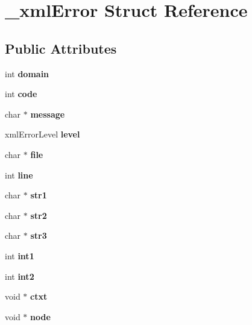 \hypertarget{struct__xml_error}{}\section{\+\_\+xml\+Error Struct Reference}
\label{struct__xml_error}
\subsection*{Public Attributes}
\begin{DoxyCompactItemize}
\item 
\mbox{\label{struct__xml_error_aab2c2106653999b10a5927fbef170134}} 
int {\bfseries domain}
\item 
\mbox{\label{struct__xml_error_a26d37a9627e5767d10642f7575b456cb}} 
int {\bfseries code}
\item 
\mbox{\label{struct__xml_error_aec639995a12899bed05700cf2e12d878}} 
char $\ast$ {\bfseries message}
\item 
\mbox{\label{struct__xml_error_a51d46e073d52e80e09c1968833549dcc}} 
xml\+Error\+Level {\bfseries level}
\item 
\mbox{\label{struct__xml_error_a26ea8c72d8741e89ae7f7aecf21e3b90}} 
char $\ast$ {\bfseries file}
\item 
\mbox{\label{struct__xml_error_af25357d13a171f2eeed7b74297d21eb1}} 
int {\bfseries line}
\item 
\mbox{\label{struct__xml_error_a910ea2be7690e0096b321f0b415aad92}} 
char $\ast$ {\bfseries str1}
\item 
\mbox{\label{struct__xml_error_ac30b76c554a115afd536016a2867143b}} 
char $\ast$ {\bfseries str2}
\item 
\mbox{\label{struct__xml_error_a8e7da080c0eacf285355e730f00bbf7b}} 
char $\ast$ {\bfseries str3}
\item 
\mbox{\label{struct__xml_error_a6f9278bc2b797ad7f6a92b765aead611}} 
int {\bfseries int1}
\item 
\mbox{\label{struct__xml_error_af540575ab3235c19f72574b54ba727dd}} 
int {\bfseries int2}
\item 
\mbox{\label{struct__xml_error_a7258bcb21de5672a51c7ef270cc0be94}} 
void $\ast$ {\bfseries ctxt}
\item 
\mbox{\label{struct__xml_error_aa5cec792d70f116cc88d9e57f18829df}} 
void $\ast$ {\bfseries node}
\end{DoxyCompactItemize}


